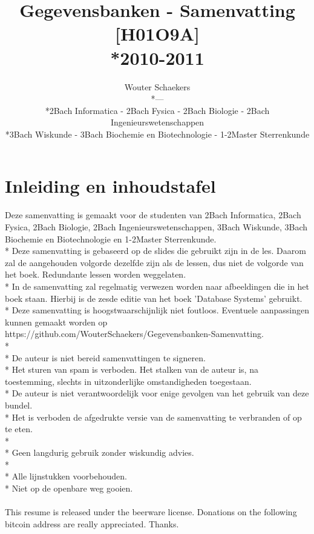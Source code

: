 \documentclass[10pt]{article}
\title{Gegevensbanken - Samenvatting [H01O9A]\\*2010-2011}
\author{Wouter Schaekers\\*---\\*2Bach Informatica - 2Bach Fysica - 2Bach Biologie - 2Bach Ingenieurswetenschappen\\*3Bach Wiskunde - 3Bach Biochemie en Biotechnologie - 1-2Master Sterrenkunde}
\begin{document}
\maketitle
\setcounter{section}{-1}
\setcounter{page}{0}
\renewcommand{\contentsname}{Inhoudstafel}
\setcounter{tocdepth}{3}
\tableofcontents
\clearpage
\section{Inleiding en inhoudstafel}
Deze samenvatting is gemaakt voor de studenten van 2Bach Informatica, 2Bach Fysica, 2Bach Biologie, 2Bach Ingenieurswetenschappen, 3Bach Wiskunde, 3Bach Biochemie en Biotechnologie en 1-2Master Sterrenkunde.\\*
Deze samenvatting is gebaseerd op de slides die gebruikt zijn in de les. Daarom zal de aangehouden volgorde dezelfde zijn als de lessen, dus niet de volgorde van het boek. Redundante lessen worden weggelaten.\\*
In de samenvatting zal regelmatig verwezen worden naar afbeeldingen die in het boek staan. Hierbij is de zesde editie van het boek 'Database Systems' gebruikt.\\*
Deze samenvatting is hoogstwaarschijnlijk niet foutloos. Eventuele aanpassingen kunnen gemaakt worden op https://github.com/WouterSchaekers/Gegevensbanken-Samenvatting.\\*\\*
De auteur is niet bereid samenvattingen te signeren.\\*
Het sturen van spam is verboden. Het stalken van de auteur is, na toestemming, slechts in uitzonderlijke omstandigheden toegestaan.\\*
De auteur is niet verantwoordelijk voor enige gevolgen van het gebruik van deze bundel.\\*
Het is verboden de afgedrukte versie van de samenvatting te verbranden of op te eten.\\*\\*
Geen langdurig gebruik zonder wiskundig advies.\\*\\*
Alle lijnstukken voorbehouden.\\*
Niet op de openbare weg gooien.\\\\
This resume is released under the beerware license. Donations on the following bitcoin address are really appreciated. Thanks.\\\\\\\\\\\\\\\\\\\\\\\\\\\\\\\\
\end{document}
